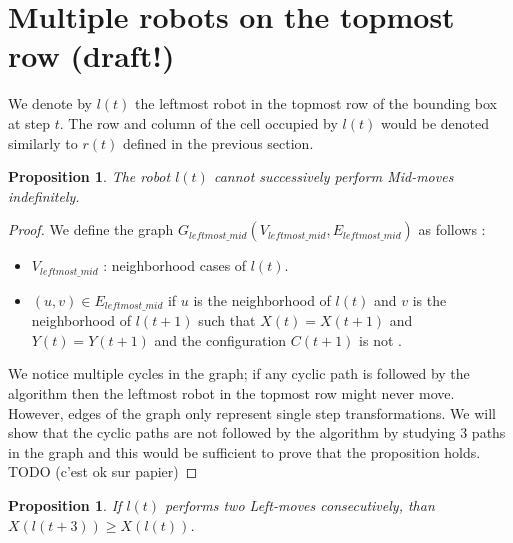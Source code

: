 \documentclass[11pt, a4paper]{article}
\theoremstyle{plain}
\newtheorem{prop}[thm]{Proposition}
\theoremstyle{definition}
\theoremstyle{remark}
\begin{document}
\section{Multiple robots on the topmost row (draft!)}

We denote by $l(t)$ the leftmost robot in the topmost row of the bounding box at
step $t$. The row and column of the cell occupied by $l(t)$ would be denoted
similarly to $r(t)$ defined in the previous section.

\begin{prop}
The robot $l(t)$ cannot successively perform \emph{Mid-move}s indefinitely.
\end{prop}

\begin{proof}

We define the graph $G_{leftmost\_mid}(V_{leftmost\_mid},
E_{leftmost\_mid})$ as follows :
\begin{itemize}
  \item $V_{leftmost\_mid}$ : neighborhood cases of $l(t)$.
  \item $(u,v) \in E_{leftmost\_mid}$ if $u$ is the neighborhood of $l(t)$ and
        $v$ is the neighborhood of $l(t+1)$ such that $X(t)=X(t+1)$ and
        $Y(t)=Y(t+1)$ and the configuration $C(t+1)$ is not \Gathered.
\end{itemize}
We notice multiple cycles in the graph; if any cyclic path is followed by the
algorithm then the leftmost robot in the topmost row might never move. However,
edges of the
graph only represent single step transformations. We will show that the cyclic
paths are not followed by the algorithm by studying 3 paths in the graph and
this would be sufficient to prove that the proposition holds. \\

TODO (c'est ok sur papier)

\end{proof}

\begin{prop}
If $l(t)$ performs two \emph{Left-move}s consecutively, than $X(l(t+3)) \geq
X(l(t))$.
\end{prop}
\end{document}
